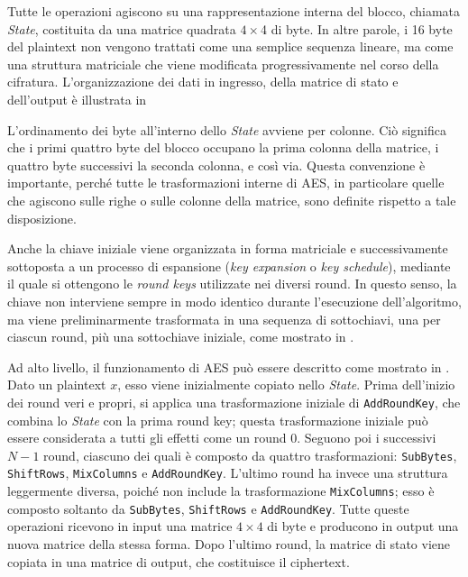 Tutte le operazioni agiscono su una rappresentazione interna del blocco, chiamata \emph{State}, costituita da una
matrice quadrata $4 \times $4 di byte. In altre parole, i 16 byte del plaintext non vengono trattati come una semplice
sequenza lineare, ma come una struttura matriciale che viene modificata progressivamente nel corso della cifratura.
L'organizzazione dei dati in ingresso, della matrice di stato e dell'output è illustrata in

L'ordinamento dei byte all'interno dello \emph{State} avviene per colonne. Ciò significa che i primi quattro byte del
blocco occupano la prima colonna della matrice, i quattro byte successivi la seconda colonna, e così via. Questa
convenzione è importante, perché tutte le trasformazioni interne di AES, in particolare quelle che agiscono sulle righe
o sulle colonne della matrice, sono definite rispetto a tale disposizione.

Anche la chiave iniziale viene organizzata in forma matriciale e successivamente sottoposta a un processo di espansione
(\emph{key expansion} o \emph{key schedule}), mediante il quale si ottengono le \emph{round keys} utilizzate nei
diversi round. In questo senso, la chiave non interviene sempre in modo identico durante l'esecuzione dell'algoritmo,
ma viene preliminarmente trasformata in una sequenza di sottochiavi, una per ciascun round, più una sottochiave
iniziale, come mostrato in .

Ad alto livello, il funzionamento di AES può essere descritto come mostrato in
. Dato un plaintext $x$, esso viene inizialmente copiato nello \emph{State}.
Prima dell'inizio dei round veri e propri, si applica una trasformazione iniziale di \texttt{AddRoundKey}, che combina
lo \emph{State} con la prima round key; questa trasformazione iniziale può essere considerata a tutti gli effetti come
un round $0$. Seguono poi i successivi $N - 1$ round, ciascuno dei quali è composto da quattro trasformazioni:
\texttt{SubBytes}, \texttt{ShiftRows}, \texttt{MixColumns} e \texttt{AddRoundKey}. L'ultimo round ha invece una
struttura leggermente diversa, poiché non include la trasformazione \texttt{MixColumns}; esso è composto soltanto da
\texttt{SubBytes}, \texttt{ShiftRows} e \texttt{AddRoundKey}. Tutte queste operazioni ricevono in input una matrice $4
\times 4$ di byte e producono in output una nuova matrice della stessa forma. Dopo l'ultimo round, la matrice di stato
viene copiata in una matrice di output, che costituisce il ciphertext.

